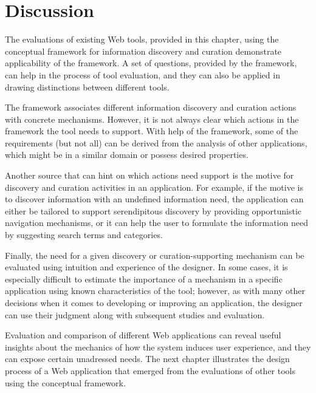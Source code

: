 {\section{Discussion}
The evaluations of existing Web tools, provided in this chapter, using the conceptual framework for information discovery and curation demonstrate applicability of the framework. A set of questions, provided by the framework, can help in the process of tool evaluation, and they can also be applied in drawing distinctions between different tools. 

The framework associates different information discovery and curation actions with concrete mechanisms. However, it is not always clear which actions in the framework the tool needs to support. With help of the framework, some of the requirements (but not all) can be derived from the analysis of other applications, which might be in a similar domain or possess desired properties. 

Another source that can hint on which actions need support is the motive for discovery and curation activities in an application. For example, if the motive is to discover information with an undefined information need, the application  can either be tailored to support serendipitous discovery by providing opportunistic navigation mechanisms, or it can help the user to formulate the information need by suggesting search terms and categories.

Finally, the need for a given discovery or curation-supporting mechanism can be evaluated using intuition and experience of the designer. In some cases, it is especially difficult to estimate the importance of a mechanism in a specific application using known characteristics of the tool; however, as with many other decisions when it comes to developing or improving an application, the designer can use their judgment along with subsequent studies and evaluation. 

Evaluation and comparison of different Web applications can reveal useful insights about the mechanics of how the system induces user experience, and they can expose certain unadressed needs. The next chapter illustrates the design process of a Web application that emerged from the evaluations of other tools using the conceptual framework. 

} %